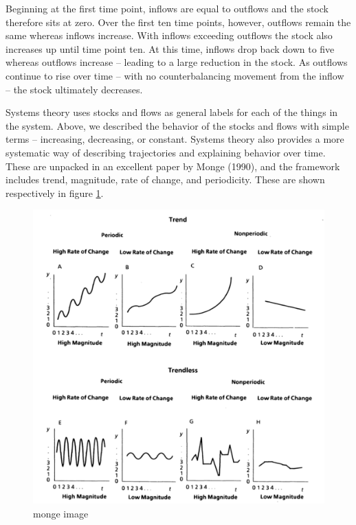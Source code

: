 \documentclass[english,,man]{apa6}
\theoremstyle{definition}
\theoremstyle{definition}
\theoremstyle{definition}
\theoremstyle{remark}
\begin{document}
\noindent Beginning at the first time point, inflows are equal to
outflows and the stock therefore sits at zero. Over the first ten time
points, however, outflows remain the same whereas inflows increase. With
inflows exceeding outflows the stock also increases up until time point
ten. At this time, inflows drop back down to five whereas outflows
increase -- leading to a large reduction in the stock. As outflows
continue to rise over time -- with no counterbalancing movement from the
inflow -- the stock ultimately decreases.

Systems theory uses stocks and flows as general labels for each of the
things in the system. Above, we described the behavior of the stocks and
flows with simple terms -- increasing, decreasing, or constant. Systems
theory also provides a more systematic way of describing trajectories
and explaining behavior over time. These are unpacked in an excellent
paper by Monge (1990), and the framework includes trend, magnitude, rate
of change, and periodicity. These are shown respectively in figure
\ref{monge}.

\begin{figure}
\centering
\includegraphics{figs/unnamed-chunk-6-1.pdf}
\caption{\label{fig:unnamed-chunk-6}monge image\label{monge}}
\end{figure}
\end{document}
